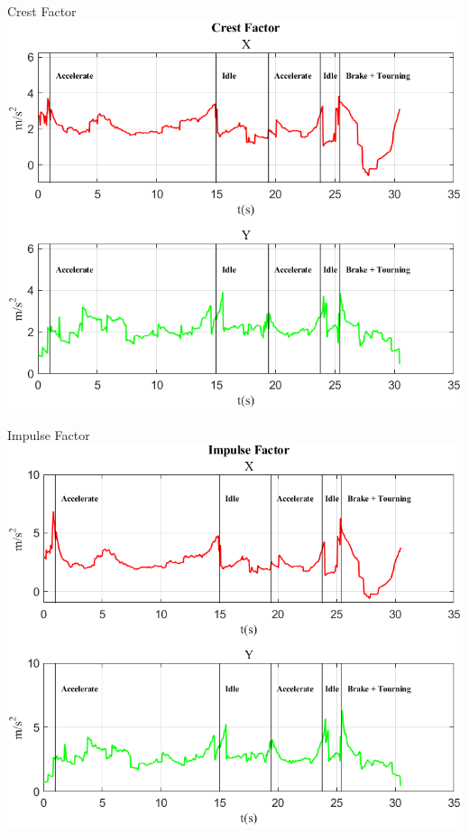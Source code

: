\documentclass[beamer]{standalone}
\begin{document}
	\begin{frame}{{Crest Factor}}
		\centering\includegraphics[height=.8\textheight]{figure/Acc/Crest Factor}
	\end{frame}
	
	\begin{frame}{{Impulse Factor}}
		\centering\includegraphics[height=.8\textheight]{figure/Acc/Impulse Factor}
	\end{frame}
	
\end{document}
